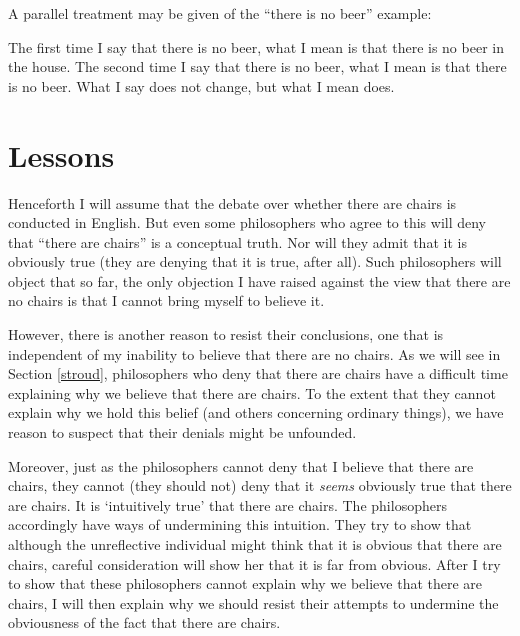 \documentclass[11pt]{article}
\begin{document}
\begin{spacing}{1.25}



A parallel treatment may be given of the ``there is no beer'' example:




The first time I say that there is no beer, what I mean is that there
is no beer in the house.  The second time I say that there is no beer,
what I mean is that there is no beer.  What I say does not change, but
what I mean does.

\section{Lessons}
\label{lessons-v}
Henceforth I will assume that the debate over whether there are chairs
is conducted in English.  But even some philosophers who agree to this
will deny that ``there are chairs'' is a conceptual truth.  Nor will
they admit that it is obviously true (they are denying that it is
true, after all).  Such philosophers will object that so far, the only
objection I have raised against the view that there are no chairs is
that I cannot bring myself to believe it.

However, there is another reason to resist their conclusions, one that
is independent of my inability to believe that there are no chairs.
As we will see in Section \ref{stroud}, philosophers who deny that
there are chairs have a difficult time explaining why we believe that
there are chairs.  To the extent that they cannot explain why we hold
this belief (and others concerning ordinary things), we have reason to
suspect that their denials might be unfounded.

Moreover, just as the philosophers cannot deny that I believe that
there are chairs, they cannot (they should not) deny that it {\em
  seems} obviously true that there are chairs.  It is `intuitively
true' that there are chairs.  The philosophers accordingly have ways
of undermining this intuition.  They try to show that although the
unreflective individual might think that it is obvious that there are
chairs, careful consideration will show her that it is far from
obvious.  After I try to show that these philosophers cannot explain
why we believe that there are chairs, I will then explain why we
should resist their attempts to undermine the obviousness of the fact
that there are chairs.

\ifstandalone
\end{spacing}


\fi
\end{document}
